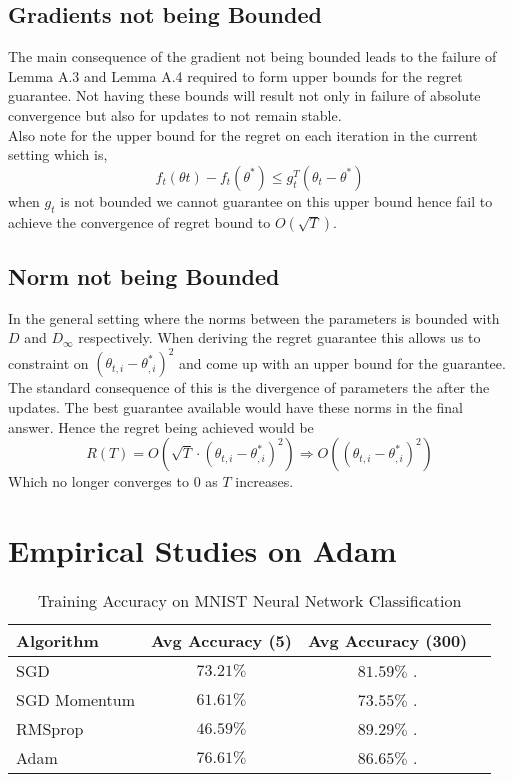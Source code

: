 \documentclass[nohyperref]{article}
\theoremstyle{plain}
\theoremstyle{definition}
\theoremstyle{remark}
\begin{document}
\subsection{Gradients not being Bounded}
The main consequence of the gradient not being bounded leads to the failure of Lemma A.3 and Lemma A.4 required to form upper bounds for the regret guarantee. Not having these bounds will result not only in failure of absolute convergence but also for updates to not remain stable. \\
Also note for the upper bound for the regret on each iteration in the current setting which is,
$$ f_{t}(\theta t) - f_{t}(\theta^{*}) \leq g_{t}^{T}(\theta_{t} - \theta^{*})
$$
when $g_{t}$ is not bounded we cannot guarantee on this upper bound hence fail to achieve the convergence of regret bound to $O(\sqrt{T})$.

\subsection{Norm not being Bounded}
In the general setting where the norms between the parameters is bounded with $D$ and $D_{\infty}$ respectively. When deriving the regret guarantee this allows us to constraint on $(\theta_{t,i} - \theta^{*}_{,i})^2$ and come up with an upper bound for the guarantee. \\
The standard consequence of this is the divergence of parameters the after the updates. The best guarantee available would have these norms in the final answer. Hence the regret being achieved would be $$R(T) = O(\sqrt{T} \cdot (\theta_{t,i} - \theta^{*}_{,i})^2) \Longrightarrow O((\theta_{t,i} - \theta^{*}_{,i})^2) $$
Which no longer converges to 0 as $T$ increases.\\

\section{Empirical Studies on Adam} %

\begin{table}[!h]
\caption{Training Accuracy on MNIST Neural Network Classification}
\label{sample-table}
\vskip 0.15in
\begin{center}
\begin{small}
\begin{tabular}{lccr}
\toprule
Algorithm & Avg Accuracy (5) & Avg Accuracy (300)\\
\midrule
SGD   &  $73.21\%$ &  $81.59\%$ . \\
SGD Momentum    &  $61.61\%$ &  $73.55\%$ . \\
RMSprop    &  $46.59\%$ &  $89.29\%$ . \\
Adam    &  $76.61\%$ &  $86.65\%$ . \\

\bottomrule
\end{tabular}
\end{small}
\end{center}
\vskip -0.1in
\end{table}
\end{document}
